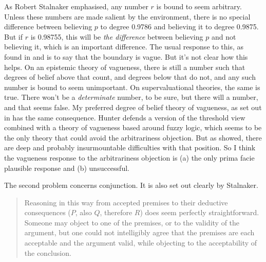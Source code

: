 As Robert Stalnaker \citeyearpar[91]{Stalnaker1984} emphasised, any number \(r\) is bound to seem arbitrary. Unless these numbers are made salient by the environment, there is no special difference between believing \(p\) to degree 0.9786 and believing it to degree 0.9875. But if \(r\) is 0.98755, this will be \textit{the difference} between believing \(p\) and not believing it, which is an important difference. The usual response to this, as found in \cite[Ch. 4]{Foley1993} and \cite{Hunter1996} is to say that the boundary is vague. But it's not clear how this helps. On an epistemic theory of vagueness, there is still a number such that degrees of belief above that count, and degrees below that do not, and any such number is bound to seem unimportant. On supervaluational theories, the same is true. There won't be a \textit{determinate} number, to be sure, but there will a number, and that seems false. My preferred degree of belief theory of vagueness, as set out in \cite{Weatherson2005-WEATTT} has the same consequence. Hunter defends a version of the threshold view combined with a theory of vagueness based around fuzzy logic, which seems to be the only theory that could avoid the arbitrariness objection. But as \cite{Williamson1994-WILV} showed, there are deep and probably insurmountable difficulties with that position. So I think the vagueness response to the arbitrariness objection is (a) the only prima facie plausible response and (b) unsuccessful. 

The second problem concerns conjunction. It is also set out clearly by Stalnaker.

\begin{quote}
Reasoning in this way from accepted premises to their deductive consequences (\(P\), also \(Q\), therefore \(R\)) does seem perfectly straightforward. Someone may object to one of the premises, or to the validity of the argument, but one could not intelligibly agree that the premises are each acceptable and the argument valid, while objecting to the acceptability of the conclusion. \cite[92]{Stalnaker1984}
\end{quote}

